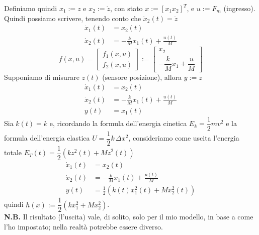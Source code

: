 \documentclass{article}
\numberwithin{equation}{subsection}
\begin{document}
Definiamo quindi $x_1 := z$ e $x_2:=\dot z$, con stato $x := [x_1x_2]^T$, e $u := F_m$ (ingresso).
\vspace*{0.1cm}\\
Quindi possiamo scrivere, tenendo conto che $\dot x_2(t) = \ddot z$
\begin{align*}
    \dot x_1(t) &= x_2(t)\\
    \dot x_2(t) &= -\frac{k}{M} x_1(t) + \frac{u(t)}{M}
\end{align*}
\begin{equation}
    f(x,u) = 
    \begin{bmatrix}
        f_1(x,u)\\
        f_2(x,u)
    \end{bmatrix}
    :=
    \begin{bmatrix}
        x_2\\
        -\dfrac{k}{M}x_1+\dfrac{u}{M}
    \end{bmatrix}
\end{equation}
Supponiamo di misurare $z(t)$ (sensore posizione), allora $y := z$
\begin{align*}
    \dot x_1(t) &= x_2(t)\\
    \dot x_2(t) &= -\frac{k}{M} x_1(t) + \frac{u(t)}{M}\\
    y(t) &= x_1(t)
\end{align*}
Sia $k(t) = k$ e, ricordando la formula dell'energia cinetica $E_{k}={\dfrac {1}{2}}mv^{2}$ e la formula dell'energia elastica $U={\dfrac {1}{2}}k\,\Delta x^{2}$, consideriamo come uscita l'energia totale $E_T (t) = \dfrac{1}{2} (k z^2 (t) + M \dot z^2 (t))$
\begin{align*}
    \dot x_1(t) &= x_2(t)\\
    \dot x_2(t) &= -\frac{k}{M} x_1(t) + \frac{u(t)}{M}\\
    y(t) &= \frac{1}{2} \left(k(t) x_1^2 (t) + M  x_2^2 (t)\right)
\end{align*}
quindi $h(x):= \dfrac{1}{2} (kx_1^2 + Mx_2^2)$.\\
\textbf{N.B.} Il risultato (l'uscita) vale, di solito, solo per il mio modello, in base a come l'ho impostato; nella realtà potrebbe essere diverso.
\end{document}
